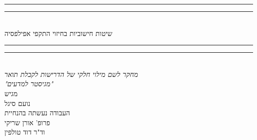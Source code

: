 \documentclass[12pt,a4paper,\pagelayoutformat,onecolumn]{book}
\def\thesisTitle{שיטות חישוביות בחיזוי התקפי אפילפסיה}
\def\thesisAuthor{נועם סיגל}
\begin{document}

\begin{center}
\vspace*{2mm}
\rule[0.5ex]{\linewidth}{2pt}\vspace*{-\baselineskip}\vspace*{3.2pt}
\rule[0.5ex]{\linewidth}{1pt}\\
[\baselineskip]{\Huge \thesisTitle}\\[3mm]
\rule[0.5ex]{\linewidth}{1pt}\vspace*{-\baselineskip}\vspace{3.2pt}
\rule[0.5ex]{\linewidth}{2pt}\\
[9mm]
{\large \textit{מחקר לשם מילוי חלקי של הדרישות לקבלת תואר\\ 
"מגיסטר למדעים"
}}\\ [2mm]
\vspace{8mm}
{\large מגיש}\\
\vspace{2.5mm}
{\large\textsc{\thesisAuthor}}\\
\vspace{10mm}
{\large העבודה נעשתה בהנחיית}\\
\vspace{2.5mm}
{\large\textsc{פרופ' אורן שריקי}}\\
\vspace{2.5mm}
{\large\textsc{וד"ר דוד טולפין}}\\
\vspace{8mm}


\end{center}
\end{document}
